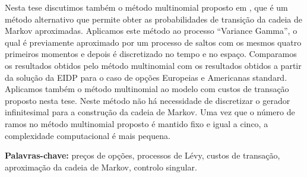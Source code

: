 Nesta tese discutimos também o método multinomial proposto em \cite{YaPr01}, que é um método alternativo que permite obter as probabilidades de transição da cadeia de Markov aproximadas. 
Aplicamos este método ao processo “Variance Gamma”, o qual é previamente aproximado por um processo de saltos com os mesmos quatro primeiros momentos e depois é discretizado 
no tempo e no espaço. 
Comparamos os resultados obtidos pelo método multinomial com os resultados obtidos a partir da solução da EIDP para o caso de opções Europeias e Americanas standard. 
Aplicamos também o método multinomial ao modelo com custos de transação proposto nesta tese. 
Neste método não há necessidade de discretizar o gerador infinitesimal para a construção da cadeia de Markov. 
Uma vez que o número de ramos no método multinomial proposto é mantido fixo e igual a cinco, a complexidade computacional é mais pequena. 

 \vspace{1em}
 \noindent \textbf{Palavras-chave:} preços de opções, processos de Lévy, custos de transação, aproximação da cadeia de Markov, controlo singular.